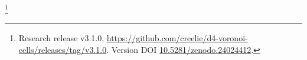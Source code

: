 \thanks{Research release v3.1.0, \url{https://github.com/creelie/d4-voronoi-cells/releases/tag/v3.1.0}. Version DOI \href{https://doi.org/10.5281/zenodo.24024412}{10.5281/zenodo.24024412}.}
